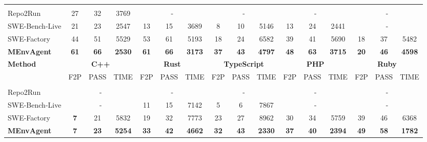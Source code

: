 \documentclass{article}
\theoremstyle{plain}
\theoremstyle{definition}
\theoremstyle{remark}
\begin{document}
\begin{table}[h]
{\begin{tabular}{lccccccccccccccc}
\rowcolor{gray!15} \multicolumn{16}{c}{\textit{Gemini-3-Flash}} \\
Repo2Run       & 27 & 32 & 3769   & \multicolumn{3}{c}{-} & \multicolumn{3}{c}{-} & \multicolumn{3}{c}{-} & \multicolumn{3}{c}{-} \\
SWE-Bench-Live        & 21 & 23 & 2547 & 13 & 15 & 3689 & 8 & 10 & 5146 & 13 & 24 & 2441 &  \multicolumn{3}{c}{-}  \\
SWE-Factory        &  44& 51 &  5529&  53& 61 & 5193 &  18& 24 & 6582 & 39 & 41 &5690  & 18 & 37 & 5482  \\
\rowcolor{blue!5}\textbf{MEnvAgent}  & \textbf{61} & \textbf{66} & \textbf{2530} & \textbf{61} &\textbf{66} & \textbf{3173} & \textbf{37} & \textbf{43} & \textbf{4797} & \textbf{48} & \textbf{63} & \textbf{3715} & \textbf{20} & \textbf{46} & \textbf{4598} \\
\midrule

\multirow{2}{*}{\textbf{Method}} & 
\multicolumn{3}{c}{\textbf{C++}} & 
\multicolumn{3}{c}{\textbf{Rust}} & 
\multicolumn{3}{c}{\textbf{TypeScript}} & 
\multicolumn{3}{c}{\textbf{PHP}} & 
\multicolumn{3}{c}{\textbf{Ruby}} \\
\cmidrule(lr){2-4} \cmidrule(lr){5-7} \cmidrule(lr){8-10} \cmidrule(lr){11-13} \cmidrule(lr){14-16}
 & F2P & PASS & TIME & F2P & PASS & TIME & F2P & PASS & TIME & F2P & PASS & TIME & F2P & PASS & TIME \\
\midrule

\rowcolor{gray!15} \multicolumn{16}{c}{\textit{Kimi-K2}} \\
Repo2Run          & \multicolumn{3}{c}{-} & \multicolumn{3}{c}{-} & \multicolumn{3}{c}{-} & \multicolumn{3}{c}{-} & \multicolumn{3}{c}{-} \\
SWE-Bench-Live        &  \multicolumn{3}{c}{-}  & 11 & 15 & 7142 & 5 & 6 & 7867 &  \multicolumn{3}{c}{-}  & \multicolumn{3}{c}{-}  \\
SWE-Factory       &  \textbf{7}&  21& 5832 &  19&  32& 7773 & 23 & 27 &8962  &30  & 34  & 5759 & 39 & 46 & 6368 \\
\rowcolor{blue!5}\textbf{MEnvAgent} & \textbf{7} & \textbf{23} & \textbf{5254} & \textbf{33} & \textbf{42} & \textbf{4662}
 & \textbf{32} & \textbf{43} & \textbf{2330} & \textbf{37} & \textbf{40} & \textbf{2394} & \textbf{49} & \textbf{58} &  \textbf{1782} \\


\end{tabular}}
\end{table}
\end{document}
